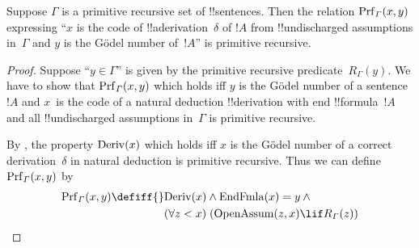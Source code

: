 \documentclass[../../../include/open-logic-section]{subfiles}
\begin{document}
\begin{prop}
  Suppose $\Gamma$ is a primitive recursive set of !!{sentence}s.
  Then the relation $\Prf[\Gamma](x, y)$ expressing ``$x$ is the code
  of !!a{derivation}~$\delta$ of $!A$ from !!{undischarged}
  assumptions in~$\Gamma$ and $y$ is the G\"odel number of~$!A$'' is
  primitive recursive.
\end{prop}

\begin{proof}
  Suppose ``$y \in \Gamma$'' is given by the primitive recursive
  predicate~$R_\Gamma(y)$.  We have to show that $\Prf[\Gamma](x, y)$
  which holds iff $y$ is the G\"odel number of a sentence~$!A$ and
  $x$~is the code of a natural deduction !!{derivation} with end
  !!{formula}~$!A$ and all !!{undischarged} assumptions in~$\Gamma$ is
  primitive recursive.

  By , the property $\mathrm{Deriv}(x)$ which holds iff
  $x$ is the G\"odel number of a correct derivation~$\delta$ in
  natural deduction is primitive recursive. Thus we can define
  $\Prf[\Gamma](x, y)$ by
  \begin{align*}
    \Prf[\Gamma](x, y) \defiff {}
    & \fn{Deriv}(x) \land \fn{EndFmla}(x) = y \land {} \\
    & \bforall{z < x}{(\fn{OpenAssum}(z, x) \lif R_\Gamma(z))}
    \qedhere
  \end{align*}
\end{proof}
\end{document}
